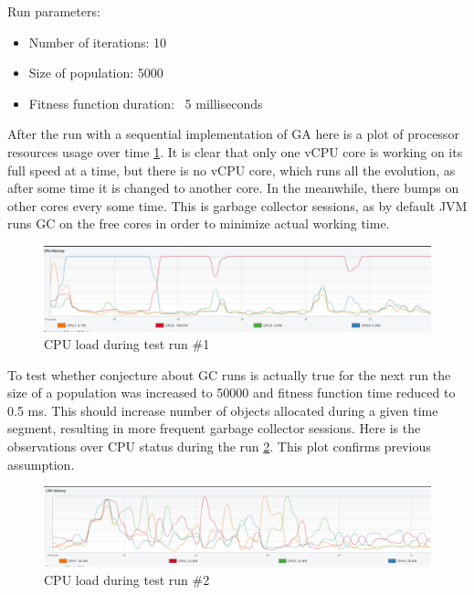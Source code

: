 Run parameters:
\begin{itemize}
\item Number of iterations: 10
\item Size of population: 5000
\item Fitness function duration: ~5 milliseconds
\end{itemize}

After the run with a sequential implementation of GA here is a plot of processor resources usage over time \ref{img:cpu-run-1}. It is clear that only one vCPU core is working on its full speed at a time, but there is no vCPU core, which runs all the evolution, as after some time it is changed to another core. In the meanwhile, there bumps on other cores every some time. This is garbage collector sessions, as by default JVM runs GC on the free cores in order to minimize actual working time.

\begin{figure}[h]
\centering\includegraphics[width=1\textwidth]{img/exp/1/cpu-500}
\caption{CPU load during test run \#1}  \label{img:cpu-run-1}
\end{figure}

To test whether conjecture about GC runs is actually true for the next run the size of a population was increased to 50000 and fitness function time reduced to 0.5 ms. This should increase number of objects allocated during a given time segment, resulting in more frequent garbage collector sessions. Here is the observations over CPU status during the run \ref{img:cpu-run-2}. This plot confirms previous assumption.

\begin{figure}[h]
\centering\includegraphics[width=1\textwidth]{img/exp/1/cpu-5000}
\caption{CPU load during test run \#2}  \label{img:cpu-run-2}
\end{figure}

